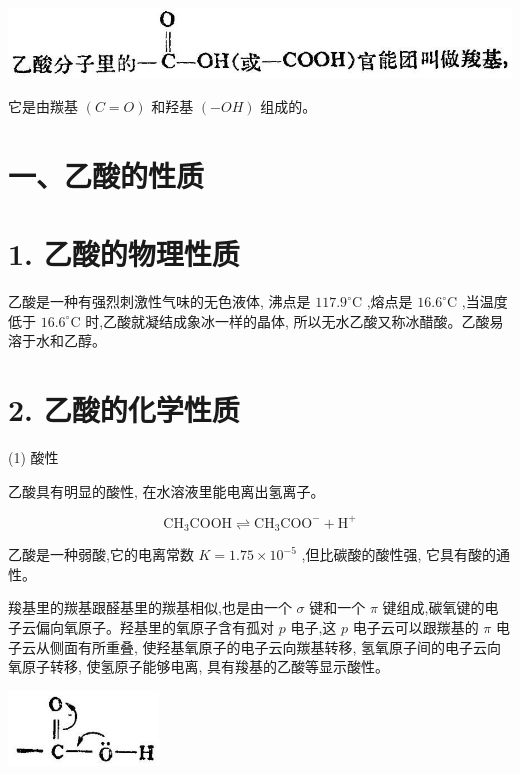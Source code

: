 \documentclass[10pt]{article}
\begin{document}
\begin{center}
\includegraphics[max width=1.0\textwidth]{images/01912d16-be99-77bb-9535-4f3ed8d9946f_132_692002.jpg}
\end{center}

它是由羰基 \(\left( {C = O}\right)\) 和羟基 \(\left( {-{OH}}\right)\) 组成的。

\section*{一、乙酸的性质}

\section*{1. 乙酸的物理性质}

乙酸是一种有强烈刺激性气味的无色液体, 沸点是 \({117.9}^{ \circ }\mathrm{C}\) ,熔点是 \({16.6}^{ \circ }\mathrm{C}\) ,当温度低于 \({16.6}^{ \circ }\mathrm{C}\) 时,乙酸就凝结成象冰一样的晶体, 所以无水乙酸又称冰醋酸。乙酸易溶于水和乙醇。

\section*{2. 乙酸的化学性质}

(1) 酸性

乙酸具有明显的酸性, 在水溶液里能电离出氢离子。

\[
{\mathrm{{CH}}}_{3}\mathrm{{COOH}} \rightleftharpoons {\mathrm{{CH}}}_{3}{\mathrm{{COO}}}^{ - } + {\mathrm{H}}^{ + }
\]

乙酸是一种弱酸,它的电离常数 \(K = {1.75} \times {10}^{-5}\) ,但比碳酸的酸性强, 它具有酸的通性。

羧基里的羰基跟醛基里的羰基相似,也是由一个 \(\sigma\) 键和一个 \(\pi\) 键组成,碳氧键的电子云偏向氧原子。羟基里的氧原子含有孤对 \(p\) 电子,这 \(p\) 电子云可以跟羰基的 \(\pi\) 电子云从侧面有所重叠, 使羟基氧原子的电子云向羰基转移, 氢氧原子间的电子云向氧原子转移, 使氢原子能够电离, 具有羧基的乙酸等显示酸性。

\begin{center}
\includegraphics[max width=0.3\textwidth]{images/01912d16-be99-77bb-9535-4f3ed8d9946f_133_703434.jpg}
\end{center}
\end{document}
